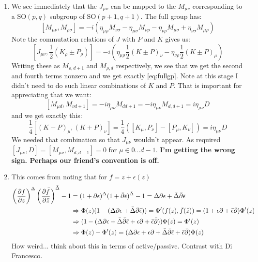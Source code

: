\documentclass[11pt]{article}
\begin{document}
\begin{enumerate}
	\item
	We see immediately that the $J_{\mu \nu}$ can be mapped to the $M_{\mu \nu}$ corresponding to a $\mathrm{SO}(p, q)$ subgroup of $\mathrm{SO}(p+1, q+1)$. The full group has:
	\begin{equation}\label{eq:fullgp}
		[M_{\mu \nu}, M_{\rho \sigma}]= -i (\eta_{\mu \rho} M_{\nu \sigma} - \eta_{\mu \sigma} M_{\nu \rho} - \eta_{\nu \rho} M_{\mu \sigma} + \eta_{\nu \sigma} M_{\mu \rho})
	\end{equation}
	 Note the commutation relations of $J$ with $P$ and $K$ gives us:
	\[
		[J_{\mu \nu}, \frac12(K_\rho \pm P_\rho) ] = -i \left( \eta_{\mu \rho} \frac12 (K \pm P)_\nu - \eta_{\nu \rho} \frac12 (K \pm P)_\mu \right)
	\]
	Writing these as $M_{\rho, d+1}$ and $M_{\rho, d}$ respectively, we see that we get the second and fourth terms nonzero and we get exactly \eqref{eq:fullgp}. Note at this stage I didn't need to do such linear combinations of $K$ and $P$. That is important for appreciating that we want:
	\[
		[M_{\mu d}, M_{\nu d+1}] = -i \eta_{\mu \nu} M_{d d+1} = - i \eta_{\mu \nu} M_{d, d+1} = i \eta_{\mu \nu} D
	\]
	and we get exactly this:
	\[
		\frac14 [(K-P)_\mu, (K + P)_\nu] = \frac14 ([K_\mu, P_\nu] - [P_\mu, K_\nu]) = i \eta_{\mu \nu} D
	\]
	We needed that combination so that $J_{\mu \nu}$ wouldn't appear. As required $[J_{\mu \nu}, D] = [M_{\mu \nu}, M_{d, d+1}]=0$ for $\mu \in 0 \dots d-1$. 
	\textbf{I'm getting the wrong sign. Perhaps our friend's convention is off.}

	\item This comes from noting that for $f = z + \epsilon(z)$
	\[
	\begin{aligned}
		\left(\frac{\partial f}{\partial z}\right)^{\Delta} \left(\frac{\partial \bar f}{\partial \bar z}\right)^{\bar \Delta} - 1 &= (1 + \partial \epsilon)^{\Delta}(1 + \bar \partial \bar \epsilon)^{\bar \Delta} - 1 = \Delta \partial \epsilon + \bar \Delta \bar \partial \bar \epsilon\\ & \Rightarrow \Phi(z) (1 - (\Delta \partial \epsilon + \bar \Delta \bar \partial \bar \epsilon)) = \Phi'(f(z), \bar f(\bar z)) = (1 + \epsilon \partial + \bar \epsilon \bar {\partial}) \Phi'(z)\\
		&\Rightarrow (1 - (\Delta \partial \epsilon + \bar \Delta \bar \partial \bar \epsilon + \epsilon \partial + \bar \epsilon \bar {\partial}) ) \Phi(z) = \Phi'(z)\\
		&\Rightarrow \Phi(z) - \Phi'(z) = (\Delta \partial \epsilon + \epsilon \partial + \bar \Delta \bar \partial \bar \epsilon + \bar \epsilon \bar {\partial} ) \Phi(z)
	\end{aligned}
	\]
	How weird... think about this in terms of active/passive. Contrast with Di Francesco. 
	

\end{enumerate}
\end{document}
